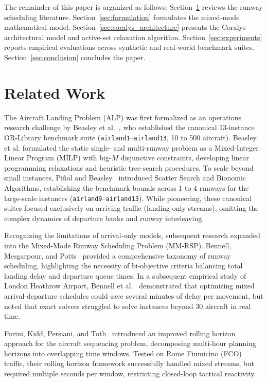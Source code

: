\documentclass[10pt,journal,compsoc]{IEEEtran}
\begin{document}
The remainder of this paper is organized as follows: Section~\ref{sec:related_work} reviews the runway scheduling literature. Section~\ref{sec:formulation} formulates the mixed-mode mathematical model. Section~\ref{sec:coralys_architecture} presents the Coralys architectural model and active-set relaxation algorithm. Section~\ref{sec:experiments} reports empirical evaluations across synthetic and real-world benchmark suites. Section~\ref{sec:conclusion} concludes the paper.

\section{Related Work}
\label{sec:related_work}

The Aircraft Landing Problem (ALP) was first formalized as an operations research challenge by Beasley et al.~\cite{beasley2000}, who established the canonical 13-instance OR-Library benchmark suite (\texttt{airland1}--\texttt{airland13}, 10 to 500 aircraft). Beasley et al. formulated the static single- and multi-runway problem as a Mixed-Integer Linear Program (MILP) with big-$M$ disjunctive constraints, developing linear programming relaxations and heuristic tree-search procedures. To scale beyond small instances, Pi{\~n}ol and Beasley~\cite{pinol2006} introduced Scatter Search and Bionomic Algorithms, establishing the benchmark bounds across 1 to 4 runways for the large-scale instances (\texttt{airland9}--\texttt{airland13}). While pioneering, these canonical suites focused exclusively on arriving traffic (landing-only streams), omitting the complex dynamics of departure banks and runway interleaving.

Recognizing the limitations of arrival-only models, subsequent research expanded into the Mixed-Mode Runway Scheduling Problem (MM-RSP). Bennell, Mesgarpour, and Potts~\cite{bennell2011} provided a comprehensive taxonomy of runway scheduling, highlighting the necessity of bi-objective criteria balancing total landing delay and departure queue times. In a subsequent empirical study of London Heathrow Airport, Bennell et al.~\cite{bennell2017} demonstrated that optimizing mixed arrival-departure schedules could save several minutes of delay per movement, but noted that exact solvers struggled to solve instances beyond 30 aircraft in real time.

Furini, Kidd, Persiani, and Toth~\cite{furini2015} introduced an improved rolling horizon approach for the aircraft sequencing problem, decomposing multi-hour planning horizons into overlapping time windows. Tested on Rome Fiumicino (FCO) traffic, their rolling horizon framework successfully handled mixed streams, but required multiple seconds per window, restricting closed-loop tactical reactivity.
\end{document}
